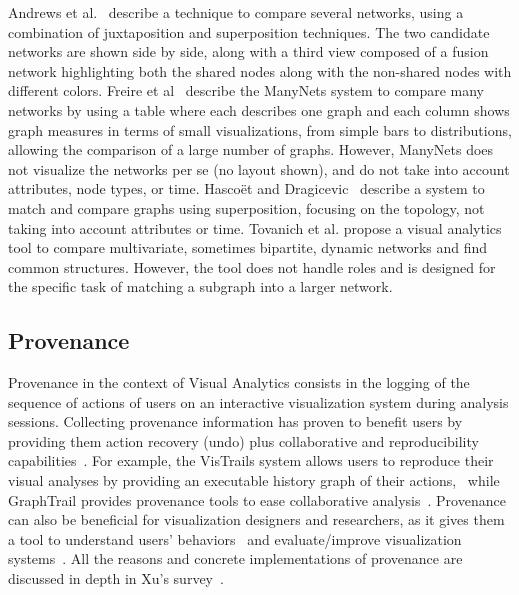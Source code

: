 Andrews et al.~\cite{andrewsVisualGraphComparison2009} describe a technique to compare several networks, using a combination of juxtaposition and superposition techniques.
The two candidate networks are shown side by side, along with a third view composed of a fusion network highlighting both the shared nodes along with the non-shared nodes with different colors.
%
Freire et al~\cite{ManyNets} describe the ManyNets system to compare many networks by using a table where each describes one graph and each column shows graph measures in terms of small visualizations, from simple bars to distributions, allowing the comparison of a large number of graphs. However, ManyNets does not visualize the networks per se (no layout shown), and do not take into account attributes, node types, or time.
%
Hascoët and Dragicevic~\cite{HascoetD12} describe a system to match and compare graphs using superposition, focusing on the topology, not taking into account attributes or time.
Tovanich et al.\cite{tovanichVAST2020Contest2021} propose a visual analytics tool to compare multivariate, sometimes bipartite, dynamic networks and find common structures.
However, the tool does not handle roles and is designed for the specific task of matching a subgraph into a larger network.

\subsection{Provenance}

Provenance in the context of Visual Analytics consists in the logging of the sequence of actions of users on an interactive visualization system during analysis sessions.
Collecting provenance information has proven to benefit users by providing them action recovery (undo) plus collaborative and reproducibility capabilities~\cite{raganCharacterizingProvenanceVisualization2016}.
For example, the VisTrails system allows users to reproduce their visual analyses by providing an executable history graph of their actions,~\cite{callahanVisTrailsVisualizationMeets2006} while GraphTrail provides provenance tools to ease collaborative analysis~\cite{dunneGraphTrailAnalyzingLarge2012}.
Provenance can also be beneficial for visualization designers and researchers, as it gives them a tool to understand users' behaviors~\cite{battleCharacterizingExploratoryVisual2019, borsProvenanceTaskAbstraction2019}
and evaluate/improve visualization systems~\cite{renCharticulatorInteractiveConstruction2019}.
All the reasons and concrete implementations of provenance are discussed in depth in Xu's survey~\cite{xuSurveyAnalysisUser2020}.


